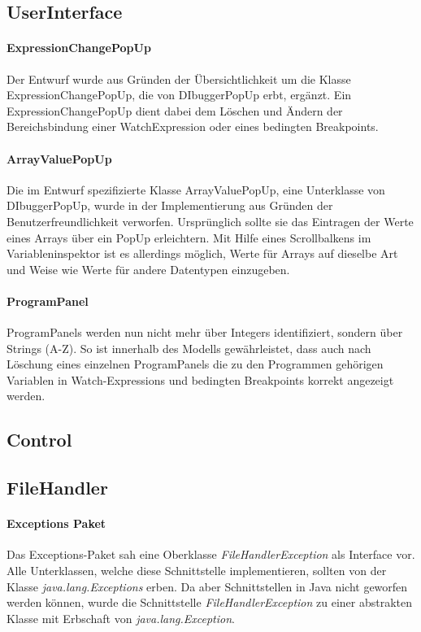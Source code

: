 \documentclass[parskip=full]{scrartcl}
\begin{document}
\subsection{UserInterface}
\paragraph{ExpressionChangePopUp}
Der Entwurf wurde aus Gründen der Übersichtlichkeit um die Klasse ExpressionChangePopUp, die von DIbuggerPopUp erbt, ergänzt. Ein ExpressionChangePopUp dient dabei dem Löschen und Ändern der Bereichsbindung einer WatchExpression oder eines bedingten Breakpoints.
\paragraph{ArrayValuePopUp}
Die im Entwurf spezifizierte Klasse ArrayValuePopUp, eine Unterklasse von DIbuggerPopUp, wurde in der Implementierung aus Gründen der Benutzerfreundlichkeit verworfen. Ursprünglich sollte sie das Eintragen der Werte eines Arrays über ein PopUp erleichtern. Mit Hilfe eines Scrollbalkens im Variableninspektor ist es allerdings möglich, Werte für Arrays auf dieselbe Art und Weise wie Werte für andere Datentypen einzugeben.
\paragraph{ProgramPanel}
ProgramPanels werden nun nicht mehr über Integers identifiziert, sondern über Strings (A-Z). So ist innerhalb des Modells gewährleistet, dass auch nach Löschung eines einzelnen ProgramPanels die zu den Programmen gehörigen Variablen in Watch-Expressions und bedingten Breakpoints korrekt angezeigt werden.
\subsection{Control}
\subsection{FileHandler}
\paragraph{Exceptions Paket}
Das Exceptions-Paket sah eine Oberklasse \textit{FileHandlerException} als Interface vor.
Alle Unterklassen, welche diese Schnittstelle implementieren, sollten von der Klasse \textit{java.lang.Exceptions} erben. Da aber Schnittstellen in Java nicht geworfen werden können, wurde die Schnittstelle \textit{FileHandlerException} zu einer abstrakten Klasse mit Erbschaft von \textit{java.lang.Exception}.
\end{document}
